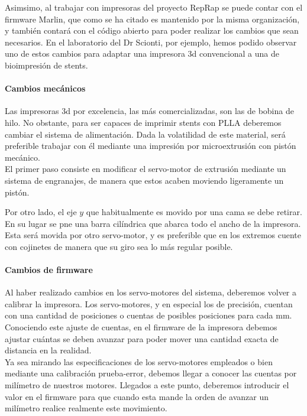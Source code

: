 \documentclass[a4paper,12pt]{article}
\begin{document}
Asimsimo, al trabajar con impresoras del proyecto RepRap se puede contar con el firmware Marlin, que como se ha citado es mantenido por la misma organización, y también contará con el código abierto para poder realizar los cambios que sean necesarios. En el laboratorio del Dr Scionti, por ejemplo, hemos podido observar uno de estos cambios para adaptar una impresora 3d convencional a una de bioimpresión de stents.\\

\paragraph{Cambios mecánicos}
Las impresoras 3d por excelencia, las más comercializadas, son las de bobina de hilo. No obstante, para ser capaces de imprimir stents con PLLA deberemos cambiar el sistema de alimentación. Dada la volatilidad de este material, será preferible trabajar con él mediante una impresión por microextrusión con pistón mecánico.\\

El primer paso consiste en modificar el servo-motor de extrusión mediante un sistema de engranajes, de manera que estos acaben moviendo ligeramente un pistón.


Por otro lado, el eje $y$ que habitualmente es movido por una cama se debe retirar. En su lugar se pne una barra cilíndrica que abarca todo el ancho de la impresora. Esta será movida por otro servo-motor, y es preferible que en los extremos cuente con cojinetes de manera que su giro sea lo más regular posible.


\paragraph{Cambios de firmware}
Al haber realizado cambios en los servo-motores del sistema, deberemos volver a calibrar la impresora. Los servo-motores, y en especial los de precisión, cuentan con una cantidad de posiciones o cuentas de posibles posiciones para cada mm. Conociendo este ajuste de cuentas, en el firmware de la impresora debemos ajustar cuántas se deben avanzar para poder mover una cantidad exacta de distancia en la realidad.\\

Ya sea mirando las especificaciones de los servo-motores empleados o bien mediante una calibración prueba-error, debemos llegar a conocer las cuentas por milímetro de nuestros motores. Llegados a este punto, deberemos introducir el valor en el firmware para que cuando esta mande la orden de avanzar un milímetro realice realmente este movimiento.\\
\end{document}
